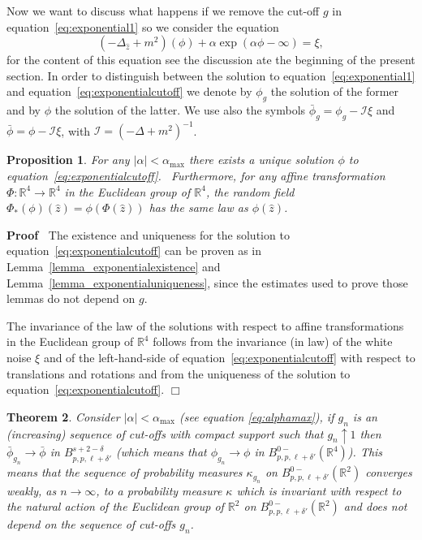 \documentclass[a4paper,10pt]{article}
\newcommand{\asterisk}{\mathord{*}}
\newenvironment{proof}{\noindent\textbf{Proof\ }}{\hspace*{\fill}$\Box$\medskip}
\newtheorem{theorem}{Theorem}
\newtheorem{proposition}[theorem]{Proposition}
{\theorembodyfont{\rmfamily}\newtheorem{remark}[theorem]{Remark}}
\begin{document}
Now we want to discuss what happens if we remove the cut-off $g$ in
equation~{\eqref{eq:exponential1}} so we consider the equation
\begin{equation}
  (- \Delta_{\hat{z}} + m^2) (\phi) + \alpha \exp (\alpha \phi - \infty) =
  \xi, \label{eq:exponentialcutoff}
\end{equation}
for the content of this equation see the discussion ate the beginning of the
present section. In order to distinguish between the solution to
equation~{\eqref{eq:exponential1}} and equation~{\eqref{eq:exponentialcutoff}}
we denote by $\phi_g$ the solution of the former and by $\phi$ the solution of
the latter. We use also the symbols $\bar{\phi}_g = \phi_g - \mathcal{I} \xi$
and $\bar{\phi} = \phi - \mathcal{I} \xi$, with $\mathcal{I} = (- \Delta +
m^2)^{- 1}$.

\begin{proposition}
  \label{proposition_g1}For any $|\alpha|<\alpha_{\text{max}}$ there exists a unique solution $\phi$ to
  equation~{\eqref{eq:exponentialcutoff}}. \ Furthermore, for any affine
  transformation $\Phi : \mathbb{R}^4 \rightarrow \mathbb{R}^4$ in the
  Euclidean group of $\mathbb{R}^4$, the random field $\Phi_{\asterisk} (\phi)
  (\hat{z}) = \phi (\Phi (\hat{z}))$ has the same law as $\phi (\hat{z})$.
\end{proposition}

\begin{proof}
  The existence and uniqueness for the solution to
  equation~{\eqref{eq:exponentialcutoff}} can be proven as in
  Lemma~\ref{lemma_exponentialexistence} and
  Lemma~\ref{lemma_exponentialuniqueness}, since the estimates used to prove
  those lemmas do not depend on $g$.
  
  The invariance of the law of the solutions with respect to affine
  transformations in the Euclidean group of $\mathbb{R}^4$ follows from the
  invariance (in law) of the white noise $\xi$ and of the left-hand-side of
  equation~{\eqref{eq:exponentialcutoff}} with respect to translations and
  rotations and from the uniqueness of the solution to
  equation~{\eqref{eq:exponentialcutoff}}.
\end{proof}

\begin{theorem}
  \label{theorem_dimensionalreduction2}Consider $|\alpha| <\alpha_{\text{max}}$ (see equation \eqref{eq:alphamax}), if $g_n$ is an (increasing) sequence of
  cut-offs with compact support such that $g_n \uparrow 1$ then
  $\bar{\phi}_{g_n} \rightarrow \bar{\phi}$ in $B^{s + 2 - \delta}_{p, p, \ell
  + \delta'}$ (which means that $\phi_{g_n} \rightarrow \phi$ in $B^{0 -}_{p,
  p, \ell + \delta'} (\mathbb{R}^4)$). This means that the sequence of
  probability measures $\kappa_{g_n}$ on $B^{0 -}_{p, p, \ell + \delta'}
  (\mathbb{R}^2)$ converges weakly, as $n \rightarrow \infty$, to a
  probability measure $\kappa$ which is invariant with respect to the natural
  action of the Euclidean group of $\mathbb{R}^2$ on $B^{0 -}_{p, p, \ell +
  \delta'} (\mathbb{R}^2)$ and does not depend on the sequence of cut-offs
  $g_n$.
\end{theorem}
\end{document}
